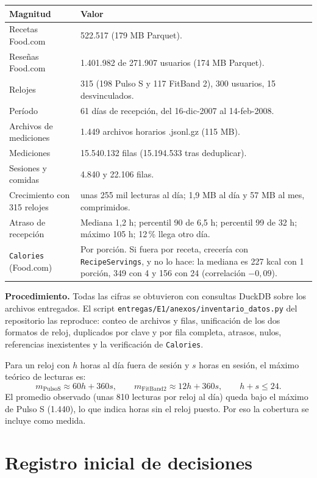 \documentclass[11pt]{article}
\newcommand{\codigo}[1]{\texttt{\small #1}}
\begin{document}
\begin{tabularx}{\linewidth}{@{}p{4.2cm}X@{}}
\toprule
\textbf{Magnitud} & \textbf{Valor}\\
\midrule
Recetas Food.com & 522.517 (179 MB Parquet).\\
Reseñas Food.com & 1.401.982 de 271.907 usuarios (174 MB Parquet).\\
Relojes & 315 (198 Pulso S y 117 FitBand 2), 300 usuarios,
15 desvinculados.\\
Período & 61 días de recepción, del 16-dic-2007 al 14-feb-2008.\\
Archivos de mediciones & 1.449 archivos horarios .jsonl.gz (115 MB).\\
Mediciones & 15.540.132 filas (15.194.533 tras deduplicar).\\
Sesiones y comidas & 4.840 y 22.106 filas.\\
Crecimiento con 315 relojes & unas 255 mil lecturas al día;
1,9 MB al día y 57 MB al mes, comprimidos.\\
Atraso de recepción & Mediana 1,2 h; percentil 90 de 6,5 h; percentil 99 de 32 h;
máximo 105 h; 12\,\% llega otro día.\\
\codigo{Calories} (Food.com) & Por porción. Si fuera por receta, crecería con
\codigo{RecipeServings}, y no lo hace: la mediana es 227 kcal con 1 porción,
349 con 4 y 156 con 24 (correlación $-0{,}09$).\\
\bottomrule
\end{tabularx}

\textbf{Procedimiento.} Todas las cifras se obtuvieron con consultas
DuckDB sobre los archivos entregados. El script
\codigo{entregas/E1/anexos/inventario\_datos.py} del repositorio las
reproduce: conteo de archivos y filas, unificación de los dos formatos
de reloj, duplicados por clave y por fila completa, atrasos, nulos,
referencias inexistentes y la verificación de \codigo{Calories}.

Para un reloj con $h$ horas al día fuera de sesión y $s$ horas en
sesión, el máximo teórico de lecturas es:
\[
m_{\mathrm{PulsoS}} \approx 60h + 360s,
\qquad
m_{\mathrm{FitBand2}} \approx 12h + 360s,
\qquad h + s \le 24.
\]
El promedio observado (unas 810 lecturas por reloj al día) queda bajo
el máximo de Pulso S (1.440), lo que indica horas sin el reloj puesto.
Por eso la cobertura se incluye como medida.

\clearpage
\section{Registro inicial de decisiones}
\end{document}
